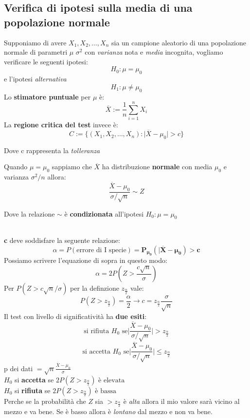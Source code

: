\documentclass[]{article}
\begin{document}
    \subsection{Verifica di ipotesi sulla media di una popolazione normale}
    Supponiamo di avere $X_1, X_2, \ldots, X_n$ sia un campione aleatorio di una popolazione normale di parametri $\mu$ $\sigma^2$ con \textit{varianza} nota e \textit{media} incognita, vogliamo verificare le seguenti ipotesi:
    \[ H_0 : \mu = \mu_0 \]
    e l'ipotesi \textit{alternativa}
    \[ H_1 : \mu \not = \mu_0 \]
    Lo \textbf{stimatore puntuale} per $\mu$ è:
    \[ \overline{X} := \frac{1}{n} \sum_{i=1}^{n} X_i \]
    La \textbf{regione critica del test} invece è:
    \[ C := \{ (X_1, X_2, \ldots, X_n) : \rvert \overline{X} - \mu_0 \rvert > c \} \]
    \centerline{Dove c rappresenta la \textit{tolleranza}}
    Quando $\mu = \mu_0$ sappiamo che $\overline{X}$ ha distribuzione \textbf{normale} con media $\mu_0$ e varianza $\sigma^2 / n$ allora:
    \[ \frac{\overline{X} - \mu_0}{\sigma / \sqrt{n}} \sim Z \]
    \centerline{Dove la relazione $\sim$ è \textbf{condizionata} all'ipotesi $H_0 : \mu = \mu_0$} \\[2ex]
    \textbf{c} deve soddisfare la seguente relazione:
    \[ \alpha = P(\text{errore di I specie}) = \boldsymbol{P_{\mu_0}(\rvert \overline{X} - \mu_0) > c} \]
    Possiamo scrivere l'equazione di sopra in questo modo:
    \[ \alpha = 2P \left( Z > \frac{c \sqrt{n}}{\sigma} \right) \]
    Per $P(Z > c \sqrt{n} / \sigma)$ per la definzione $z_{\frac{\alpha}{2}}$ vale:
    \[ P\left( Z > z_{\frac{\alpha}{2}} \right)= \frac{\alpha}{2} \longrightarrow c = z_{\frac{\alpha}{2}} \frac{\sigma}{\sqrt{n}}\]
    Il test con livello di significatività ha \textbf{due esiti}:
    \[ \text{si rifiuta } H_0 \text{ se} \bigg\rvert \frac{\overline{X} - \mu_0}{\sigma / \sqrt{n}} \bigg\rvert > z_{\frac{\alpha}{2}} \]
    \[ \text{si accetta } H_0 \text{ se} \bigg\rvert \frac{\overline{X} - \mu_0}{\sigma / \sqrt{n}} \bigg\rvert \leq z_{\frac{\alpha}{2}} \]
    p dei dati $= \sqrt{n} \frac{\overline{X} - \mu_0}{\sigma}$ \\[2ex]
    $H_0$ si \textbf{accetta} se $2P(Z > z_{\frac{\alpha}{2}}) \text{ è elevata}$ \\
    $H_0$ si \textbf{rifiuta} se $2P(Z > z_{\frac{\alpha}{2}}) \text{ è bassa}$ \\
    Perche se la probabilità che $Z$ sia $> z_{\frac{\alpha}{2}}$ è \textit{alta} allora il mio valore sarà vicino al mezzo e va bene. Se è basso allora è \textit{lontano} dal mezzo e non va bene.
\end{document}
